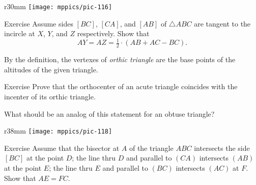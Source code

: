 {

\begin{wrapfigure}{r}{30mm}
\centering
\texttt{[image: mppics/pic-116]}
\end{wrapfigure}

\begin{thm}{Exercise}\label{ex:2x=b+c-a}
Assume sides $[B C]$, $[C A]$, and $[A B]$ of $\triangle A B C$ are tangent to the incircle at $X$, $Y$, and $Z$ respectively. 
Show that 
$$AY=AZ= \tfrac12\cdot(A B+ A C- B C).$$

\end{thm}

By the definition, the vertexes of \emph{orthic triangle} are the base points of the altitudes of the given triangle.

}

\begin{thm}{Exercise}\label{ex:orthic-triangle}
Prove that the orthocenter of an acute triangle coincides with the incenter of its orthic triangle.

What should be an analog of this statement for an obtuse triangle?
\end{thm}



\begin{wrapfigure}{r}{38mm}
\vskip-4mm
\centering
\texttt{[image: mppics/pic-118]}
\end{wrapfigure}

\begin{thm}{Exercise}\label{ex:bisector-parallel} 
Assume that the bisector at $A$ of the triangle $ABC$ intersects the side $[BC]$ at the point $D$;
the line thru $D$ and parallel to $(CA)$ intersects $(AB)$ at the point $E$;
the line thru $E$ and parallel to $(BC)$ intersects $(AC)$ at $F$.
Show that $AE=FC$.
\end{thm}


